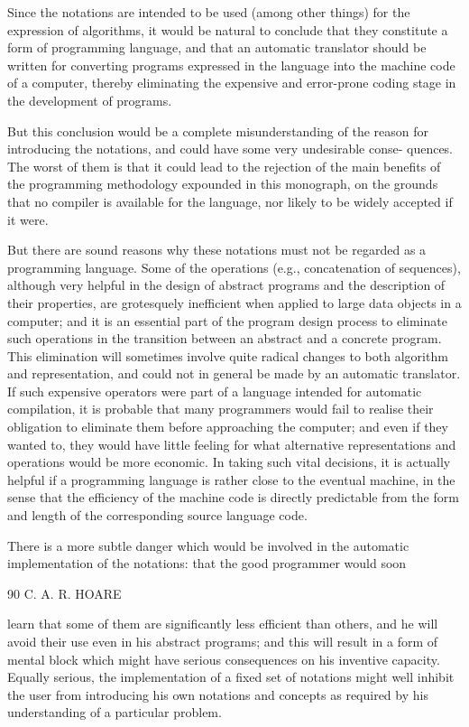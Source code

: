 Since the notations are intended to be used (among other things) for the expression of algorithms, it would be natural to conclude that they constitute a form of programming language, and that an automatic translator should be written for converting programs expressed in the language into the machine code of a computer, thereby eliminating the expensive and error-prone coding stage in the development of programs.

But this conclusion would be a complete misunderstanding of the reason for introducing the notations, and could have some very undesirable conse- quences. The worst of them is that it could lead to the rejection of the main benefits of the programming methodology expounded in this monograph, on the grounds that no compiler is available for the language, nor likely to be widely accepted if it were.

But there are sound reasons why these notations must not be regarded as a programming language. Some of the operations (e.g., concatenation of sequences), although very helpful in the design of abstract programs and the description of their properties, are grotesquely inefficient when applied to large data objects in a computer; and it is an essential part of the program design process to eliminate such operations in the transition between an abstract and a concrete program. This elimination will sometimes involve quite radical changes to both algorithm and representation, and could not in general be made by an automatic translator. If such expensive operators were part of a language intended for automatic compilation, it is probable that many programmers would fail to realise their obligation to eliminate them before approaching the computer; and even if they wanted to, they would have little feeling for what alternative representations and operations would be more economic. In taking such vital decisions, it is actually helpful if a programming language is rather close to the eventual machine, in the sense that the efficiency of the machine code is directly predictable from the form and length of the corresponding source language code.

There is a more subtle danger which would be involved in the automatic implementation of the notations: that the good programmer would soon

90 C. A. R. HOARE

learn that some of them are significantly less efficient than others, and he will avoid their use even in his abstract programs; and this will result in a form of mental block which might have serious consequences on his inventive capacity. Equally serious, the implementation of a fixed set of notations might well inhibit the user from introducing his own notations and concepts as required by his understanding of a particular problem.

